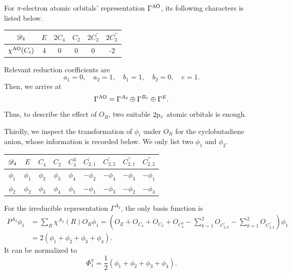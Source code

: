 		For $\pi$-electron atomic orbitals' representation $\Gamma^{\rm AO}$, its following characters is listed below.
		\begin{center}
		\setlength{\abovecaptionskip}{-0.3em}
		\begin{tabular}{cccccc}\hline
	$\mathscr{D}_{\rm 4}$	& $E$ & $2C_4$ &	$C_2$	& $2C^\prime_2$ & $2C^{\prime\prime}_2$ \\ \hline
	$\chi^{{\rm AO}}(C_i)$	&	4	&	0	&	0	&	0	&	-2	\\ \hline
		\end{tabular}
		\end{center}
		
		Relevant reduction coefficients are
		\begin{equation*}
		a_1 = 0, \quad a_2 = 1, \quad b_1 = 1, \quad b_2 = 0, \quad e = 1.
		\end{equation*}
		Then, we arrive at		
		\begin{equation*}
			\Gamma^{{\rm AO}} = \Gamma^{A_2} \oplus \Gamma^{B_1} \oplus \Gamma^{E}.
		\end{equation*}
		Thus, to describe the effect of $O_R$, two suitable $2{\rm p}_{z}$ atomic orbitals is enough. 
		
		Thirdly, we inspect the transformation of $\phi_i$ under $O_R$ for the cyclobutadiene anion, whose information is recorded below. We only list two $\phi_1$ and $\phi_2$.
		\begin{center}
		\setlength{\abovecaptionskip}{-0.5em}
		\begin{tabular}{ccccccccc}\hline
	$\mathscr{D}_{\rm 4}$ & $E$ & $C_4$ & $C_2$ & $C^3_4$	&	$C^\prime_{2,1}$	&	$C^\prime_{2,2}$ &	$C^{\prime\prime}_{2,1}$	&	$C^{\prime\prime}_{2,2}$	\\ \hline
			$\phi_1$	&	$\phi_1$	&	$\phi_2$	&	$\phi_3$	&	$\phi_4$	&	$-\phi_2$	&	$-\phi_4$	&	$-\phi_3$	&	$-\phi_1$	\\
			$\phi_2$	&	$\phi_2$	&	$\phi_3$	&	$\phi_4$	&	$\phi_1$	&	$-\phi_1$	&	$-\phi_3$	&	$-\phi_2$	&	$-\phi_4$	\\ \hline
		\end{tabular}
		\end{center}
		
		For the irreducible representation $\Gamma^{A_2}$, the only basis function is
		\begin{align*}
			P^{A_2}\phi_1 &= \sum_{R} \chi^{A_2}(R) O_R \phi_1 = (O_E + O_{C_4} + O_{C_2} + O_{C^3_4} - \sum_{k=1}^2 O_{C^\prime_{2,k}} -\sum_{k=1}^2 O_{C^{\prime\prime}_{2,k}} )\phi_1 \\
			&= 2(\phi_1+\phi_2+\phi_3+\phi_4).
		\end{align*}
		It can be normalized to
		\begin{equation}
			\Phi^\pi_1 = \frac{1}{2}(\phi_1+\phi_2+\phi_3+\phi_4).
		\end{equation}
		
